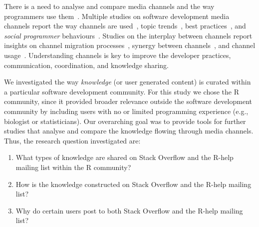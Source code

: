There is a need to analyse and compare media channels and the way programmers use them~\cite{Vasilescu2014b}.
    Multiple studies on software development media channels report the way channels are used~\cite{Guzzi2013, Storey2014, Singer2014},  topic trends~\cite{Barua2012, Kavaler2013, Wang2013d}, best practices~\cite{Asaduzzaman2013, Treude2011, Allamanis2013}, and \textit{social programmer} behaviours~\cite{Lang2013}.
    Studies on the interplay between channels report insights on channel migration processes~\cite{Vasilescu2014c}, synergy between channels~\cite{Vasilescu2013a, Bird2006, Kavaler2013}, and channel usage~\cite{Stolee2010,Storey2014}.
Understanding channels is key to improve the developer practices, communication, coordination, and knowledge sharing.


    We investigated the way \textit{knowledge} (or user generated content) is curated within a particular software development community.
    For this study we chose the R community, since it provided broader relevance outside the software development community by including users with no or limited programming experience (e.g., biologist or statisticians).
    Our overarching goal was to provide tools for further studies that analyse and compare the knowledge flowing through media channels.
    Thus, the research question investigated are:

    \begin{enumerate}[label=\bfseries{RQ-\arabic*.},itemsep=3pt, topsep=2pt, leftmargin=3em, parsep=0pt]
        \item What types of knowledge are shared on Stack Overflow and the R-help mailing list within the R community?
        \item How is the knowledge constructed on Stack Overflow and the R-help mailing list? 
        \item Why do certain users post to both Stack Overflow and the R-help mailing list?
    \end{enumerate}

